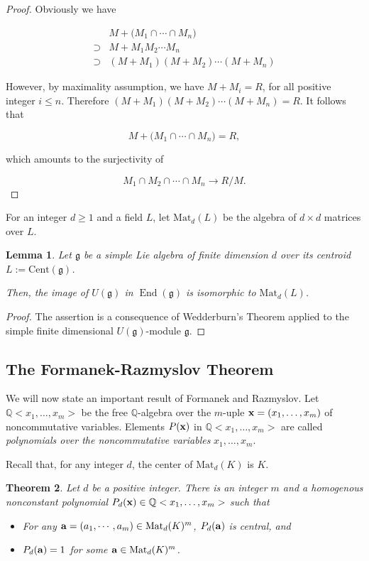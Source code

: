 \documentclass[11pt, letterpaper, reqno]{amsart}
\newtheorem{theorem}{Theorem}
\newtheorem{lemma}[theorem]{Lemma}
\theoremstyle{definition}
\newcommand{\End}{\operatorname{End}}
\newcommand{\Q}{{\mathbb Q}}
\newcommand{\fg}{\mathfrak{g}}
\newcommand{\Cent}{\mathrm{Cent}}
\newcommand{\Mat}{\mathrm{Mat}}
\begin{document}
\begin{proof} Obviously we have

\begin{align*}
&M+\big(M_1\cap \cdots \cap M_n\big)\\
\supset& M+M_1M_2\cdots M_n\\
\supset&(M+M_1)(M+M_2)\cdots (M+M_n)
\end{align*}

\noindent However, by  maximality assumption,
we have $M+M_i=R$, for all positive integer $i\leq n$.
Therefore $(M+M_1)(M+M_2)\cdots (M+M_n)=R$.
It follows that

$$M+\big(M_1\cap \cdots \cap M_n\big)=R,$$

\noindent which amounts to the surjectivity of

$$M_1\cap M_2\cap\cdots\cap M_n\to  R/M.$$
\end{proof}

For an integer $d\geq 1$ and a field $L$,
 let $\Mat_d(L)$ be the algebra of
$d\times d$ matrices over $L$.

\begin{lemma}\label{Wedderburn} Let $\fg$ be a simple  Lie algebra
of finite dimension $d$ over its centroid  $L:=\Cent(\fg)$. 

Then, the image of $U(\fg)$ in $\End(\fg)$ is isomorphic to $\Mat_d(L)$.
\end{lemma}

\begin{proof} The assertion is a consequence of Wedderburn's Theorem applied to the 
simple finite dimensional $U(\fg)$-module
$\fg$. 
\end{proof}


\subsection{The Formanek-Razmyslov Theorem}


We will now state an important result of Formanek and Razmyslov. Let $\Q<x_1,\ldots,x_m>$ be the 
free $\Q$-algebra  over the $m$-uple
 ${\bf x}=(x_1,\ldots,x_m)$ of noncommutative variables. Elements $P({\bf x})$ in 
$\Q<x_1,\ldots,x_m>$ are called 
{\it polynomials over the noncommutative variables}
$x_1,\ldots,x_m$. 

Recall that, for any integer $d$, the center of $\Mat_d(K)$ is $K$. 


\begin{theorem}\cite{Formanek}\cite{Razmyslov}\label{RazFor}
Let $d$ be a positive integer. There is an integer $m$ and a homogenous nonconstant polynomial
$P_d({\bf x})\in \Q<x_1,\ldots,x_m>$ such that

\begin{itemize}
\item[(a)] For any ${\bf a}=(a_1,\cdots ,a_m)\in \Mat_d(K)^m$, 
$P_d({\bf a})$ is central, and

\item[(b)] $P_d({\bf a})=1$ 
for some ${\bf a}\in \Mat_d(K)^m$.
\end{itemize}
\end{theorem}
\end{document}
